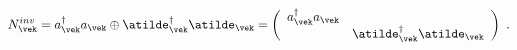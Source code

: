 \begin{equation}
   N^{inv}_{\vek} = a^\dagger_{\vek}a_{\vek} \oplus \atilde^\dagger_{\vek}
   \atilde_{\vek}
   \mbox{} = \left( \begin{array}{cc} a^\dagger_{\vek}a_{\vek} &
   \mbox{} \\ \mbox{} & \atilde^\dagger_{\vek}
   \atilde_{\vek} \end{array} \right) \ .
\end{equation}

